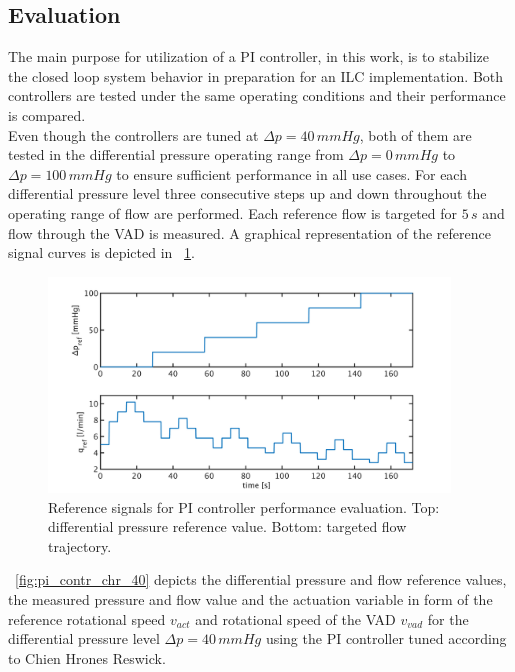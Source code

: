 \subsection{Evaluation}
The main purpose for utilization of a PI controller, in this work, is to stabilize the closed loop system behavior in preparation for an ILC implementation.
Both controllers are tested under the same operating conditions and their performance is compared.
\\Even though the controllers are tuned at $\Delta{p}=40\,mmHg$, both of them  are tested in the differential pressure operating range from $\Delta{p}=0\,mmHg$ to $\Delta{p}=100\,mmHg$ to ensure sufficient performance in all use cases.
For each differential pressure level three consecutive steps up and down throughout the operating range of flow are performed. Each reference flow is targeted for $5\,s$ and flow through the VAD is measured. A graphical representation of the reference signal curves is depicted in \figurename~\ref{fig:PI_control_ref_signals}.
\begin{figure}[ht]
  \centering
  \includegraphics[width=0.95\textwidth]{images/chapt_5/PI_control_ref_signals.pdf}
  \caption[Reference signals for PI controller performance evaluation]{Reference signals for PI controller performance evaluation. Top: differential pressure reference value. Bottom: targeted flow trajectory.}
  \label{fig:PI_control_ref_signals}
\end{figure}
\figurename~\ref{fig:pi_contr_chr_40} depicts the differential pressure and flow reference values, the measured pressure and flow value and the actuation variable in form of the reference rotational speed $v_{act}$ and rotational speed of the VAD $v_{vad}$ for the differential pressure level $\Delta{p}=40\,mmHg$ using the PI controller tuned according to Chien Hrones Reswick.
